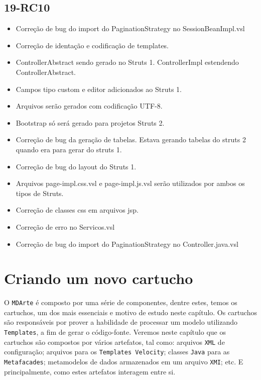 \section{19-RC10}

\begin{itemize}
  \item Correção de bug do import do PaginationStrategy no SessionBeanImpl.vsl
  \item Correção de identação e codificação de templates.
  \item ControllerAbstract sendo gerado no Struts 1. ControllerImpl estendendo ControllerAbstract.
  \item Campos tipo custom e editor adicionados ao Struts 1.
  \item Arquivos serão gerados com codificação UTF-8.
  \item Bootstrap só será gerado para projetos Struts 2.
  \item Correção de bug da geração de tabelas. Estava gerando tabelas do struts 2 quando era para gerar do struts 1.
  \item Correção de bug do layout do Struts 1.
  \item Arquivos page-impl.css.vsl e page-impl.js.vsl serão utilizados por ambos os tipos de Struts.
  \item Correção de classes css em arquivos jsp.
  \item Correção de erro no Servicos.vsl
  \item Correção de bug do import do PaginationStrategy no Controller.java.vsl
\end{itemize}

\chapter{Criando um novo cartucho}

O \texttt{MDArte} é composto por uma série de componentes, dentre estes, temos
os cartuchos, um dos mais essenciais e motivo de estudo neste capítulo. Os
cartuchos são responsáveis por prover a habilidade de processar um modelo
utilizando \texttt{Templates}, a fim de gerar o código-fonte. Veremos neste
capítulo que os cartuchos são compostos por vários artefatos, tal como: arquivos
\texttt{XML} de configuração; arquivos para os \texttt{Templates Velocity};
classes \texttt{Java} para as \texttt{Metafacades}; metamodelos de dados
armazenados em um arquivo \texttt{XMI}; etc. E principalmente, como estes
artefatos interagem entre si.

